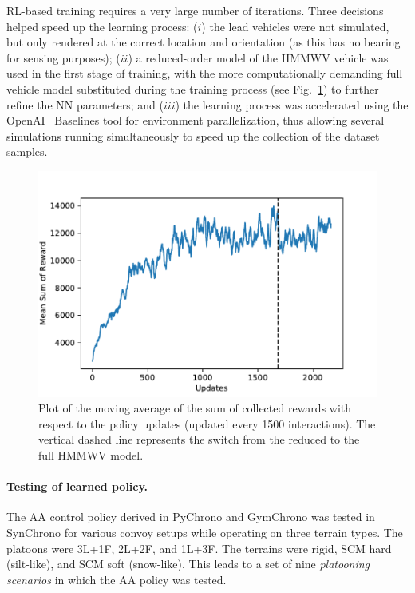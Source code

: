 \documentclass[12pt,twocolumn]{article}
\begin{document}
RL-based training requires a very large number of iterations. Three decisions helped speed up the learning process: ($i$) the lead vehicles were not simulated, but only rendered at the correct location and orientation (as this has no bearing for sensing purposes); ($ii$) a reduced-order model of the HMMWV vehicle was used in the first stage of training, with the more computationally demanding full vehicle model substituted during the training process (see Fig.~\ref{fig:Rewards}) to further refine the NN parameters; and ($iii$) the learning process was accelerated using the OpenAI~\cite{Brockman16Gym} Baselines tool for environment parallelization, thus allowing several simulations running simultaneously to speed up the collection of the dataset samples.


\begin{figure}
	\centering
	\includegraphics[width=\columnwidth]{Figs/rewards.pdf}
	\caption{Plot of the moving average of the sum of collected rewards with respect to the policy updates (updated every 1500 interactions). The vertical dashed line represents the switch from the reduced to the full HMMWV model.}
	\label{fig:Rewards}
\end{figure}


\paragraph{Testing of learned policy.}  The AA control policy derived in PyChrono and GymChrono was tested in SynChrono for various convoy setups while operating on three terrain types. The platoons were 3L+1F, 2L+2F, and 1L+3F. The terrains were rigid, SCM hard (silt-like), and SCM soft (snow-like). This leads to a set of nine \textit{platooning scenarios} in which the AA policy was tested. 
\end{document}
